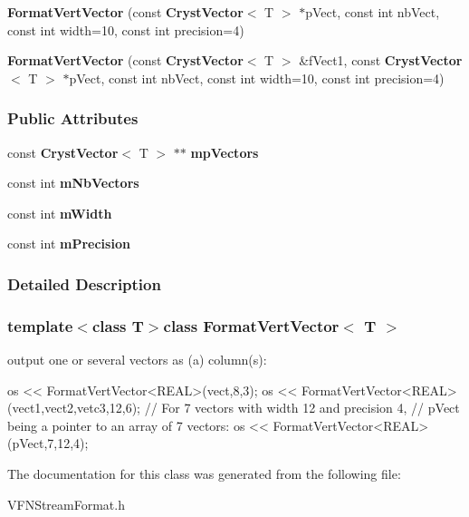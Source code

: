 \begin{DoxyCompactItemize}
\item 
{\bfseries \-Format\-Vert\-Vector} (const {\bf \-Cryst\-Vector}$<$ \-T $>$ $\ast$p\-Vect, const int nb\-Vect, const int width=10, const int precision=4)\label{a00032_affdcb56b538bee3033cf89177e2eaa4e}

\item 
{\bfseries \-Format\-Vert\-Vector} (const {\bf \-Cryst\-Vector}$<$ \-T $>$ \&f\-Vect1, const {\bf \-Cryst\-Vector}$<$ \-T $>$ $\ast$p\-Vect, const int nb\-Vect, const int width=10, const int precision=4)\label{a00032_a6ca2c9a79903a6d4ba997d413ed8a238}

\end{DoxyCompactItemize}
\subsubsection*{\-Public \-Attributes}
\begin{DoxyCompactItemize}
\item 
const {\bf \-Cryst\-Vector}$<$ \-T $>$ $\ast$$\ast$ {\bfseries mp\-Vectors}\label{a00032_a373ff434e999897fb583bd4534f18167}

\item 
const int {\bfseries m\-Nb\-Vectors}\label{a00032_a4f7519552502a0968432d19fd2b0df4b}

\item 
const int {\bfseries m\-Width}\label{a00032_a0ea4d4aae7292f4e5421558156f4ba9e}

\item 
const int {\bfseries m\-Precision}\label{a00032_ad64d9a4b653d32862fa7abcc08972249}

\end{DoxyCompactItemize}


\subsubsection{\-Detailed \-Description}
\subsubsection*{template$<$class T$>$class Format\-Vert\-Vector$<$ T $>$}

output one or several vectors as (a) column(s)\-: 


\begin{DoxyCode}
  os << FormatVertVector<REAL>(vect,8,3);
  os << FormatVertVector<REAL>(vect1,vect2,vetc3,12,6);
  // For 7 vectors with width 12 and precision 4,
  // pVect being a pointer to an array of 7 vectors:
  os << FormatVertVector<REAL>(pVect,7,12,4);
\end{DoxyCode}
 

\-The documentation for this class was generated from the following file\-:\begin{DoxyCompactItemize}
\item 
\-V\-F\-N\-Stream\-Format.\-h\end{DoxyCompactItemize}
